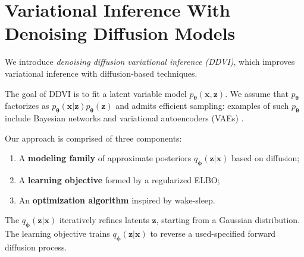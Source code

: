 \documentclass[letterpaper]{article} %
\newcommand{\bx}{\mathbf{x}}
\newcommand{\bz}{\mathbf{z}}
\let\oldtheta\theta
\renewcommand{\theta}{{\boldsymbol \oldtheta}}
\let\oldphi\phi
\renewcommand{\phi}{{\boldsymbol \oldphi}}
\begin{document}


\section{Variational Inference With\\Denoising Diffusion Models}
\label{sec:diffvae}

We introduce {\em denoising diffusion variational inference (DDVI)}, which improves variational inference with diffusion-based techniques.

The goal of DDVI is to fit a latent variable model $p_\theta(\bx,\bz)$.
We assume that $p_\theta$ factorizes as $p_\theta(\bx|\bz)p_\theta(\bz)$ and admits efficient sampling: examples of such $p_\theta$ include Bayesian networks and variational autoencoders (VAEs) \cite{kingma2013auto}.

Our approach is comprised of three components: 
\begin{enumerate}
    \item A \textbf{modeling family} of approximate posteriors $q_\phi(\bz | \bx)$ based on diffusion;
    \item A \textbf{learning objective} formed by a regularized ELBO;
    \item An \textbf{optimization algorithm} inspired by wake-sleep.
\end{enumerate}
The $q_\phi(\bz | \bx)$ iteratively refines latents $\bz$, starting from a Gaussian distribution. 
The learning objective trains $q_\phi(\bz | \bx)$ to reverse a used-specified forward diffusion process.
\end{document}
